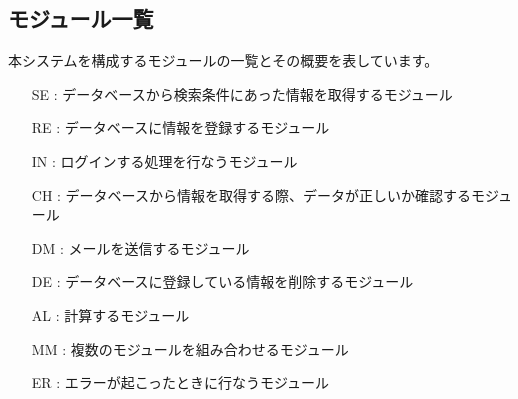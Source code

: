 \documentclass[a4j,titlepage]{jarticle}
\begin{document}
\subsection{モジュール一覧}
本システムを構成するモジュールの一覧とその概要を表しています。
\begin{enumerate}
\item [SE] : データベースから検索条件にあった情報を取得するモジュール
\item [RE] : データベースに情報を登録するモジュール
\item [IN] : ログインする処理を行なうモジュール
\item [CH] : データベースから情報を取得する際、データが正しいか確認するモジュール
\item [DM] : メールを送信するモジュール
\item [DE] : データベースに登録している情報を削除するモジュール
\item [AL] : 計算するモジュール
\item [MM] : 複数のモジュールを組み合わせるモジュール
\item [ER] : エラーが起こったときに行なうモジュール
\end{enumerate}
\end{document}
